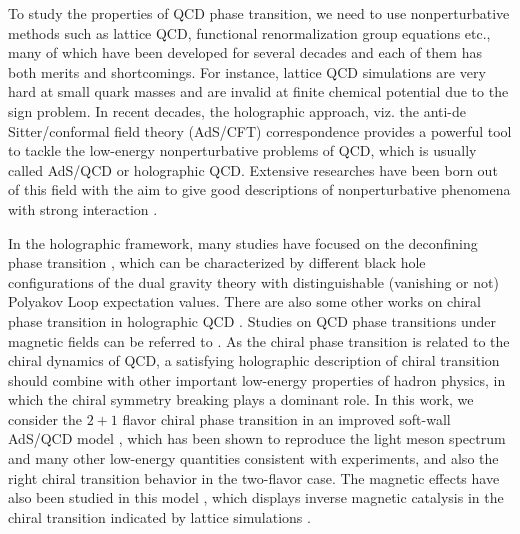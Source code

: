 \documentclass[11pt,a4paper,psfrag]{article}
\begin{document}
To study the properties of QCD phase transition, we need to use nonperturbative methods such as lattice QCD, functional renormalization group equations etc., many of which have been developed for several decades and each of them has both merits and shortcomings. For instance, lattice QCD simulations are very hard at small quark masses and are invalid at finite chemical potential due to the sign problem. In recent decades, the holographic approach, viz. the anti-de Sitter/conformal field theory (AdS/CFT) correspondence \cite{Maldacena:1997re,Gubser:1998bc,Witten:1998qj} provides a powerful tool to tackle the low-energy nonperturbative problems of QCD, which is usually called AdS/QCD or holographic QCD. Extensive researches have been born out of this field with the aim to give good descriptions of nonperturbative phenomena with strong interaction \cite{Erlich:2005qh,Karch:2006pv,TB:05,DaRold2005,D3-D7,D4-D6,SS-1,SS-2,Csaki:2006ji,Cherman:2008eh,Dp-Dq,GKK1,GKK2,Sui:2009xe,Sui:2010ay,
Cui:2013xva,Fang:2016nfj,Li:2012ay,Li:2013oda,Shuryak:2004cy,Tannenbaum:2006ch,Policastro:2001yc,Cai:2009zv,Cai:2008ph,Sin:2004yx,Shuryak:2005ia,
Nastase:2005rp,Nakamura:2006ih,Sin:2006pv,Janik:2005zt,Herzog:2006gh,Gubser-drag,Li:2014hja,Li:2014dsa}.

In the holographic framework, many studies have focused on the deconfining phase transition \cite{Herzog:2006ra,BallonBayona:2007vp, Cai:2007zw,Kim:2007em,Andreev-T3,Colangelo:2010pe,Gubser:2008yx,Gubser:2008ny,Gubser:2008sz,Gursoy:2008bu,Gursoy,Gursoy-3,Gursoy:2008za, Finazzo:2014zga,Yaresko:2013tia,Li:2011hp,Cai:2012xh,He:2013qq,Yang:2014bqa,Cui:2014oba}, which can be characterized by different black hole configurations of the dual gravity theory with distinguishable (vanishing or not) Polyakov Loop expectation values. There are also some other works on chiral phase transition in holographic QCD \cite{Colangelo:2011sr,Chelabi:2015cwn,Chelabi:2015gpc,Li:2016smq,Bartz:2016ufc,Bartz:2017jku}. Studies on QCD phase transitions under magnetic fields can be referred to \cite{Evans:2016jzo,Fang:2016cnt,Mamo:2016xco,Dudal:2016joz,Dudal:2018rki, Ballon-Bayona:2017dvv}. As the chiral phase transition is related to the chiral dynamics of QCD, a satisfying holographic description of chiral transition should combine with other important low-energy properties of hadron physics, in which the chiral symmetry breaking plays a dominant role. In this work, we consider the $2+1$ flavor chiral phase transition in an improved soft-wall AdS/QCD model \cite{Fang:2016nfj}, which has been shown to reproduce the light meson spectrum and many other low-energy quantities consistent with experiments, and also the right chiral transition behavior in the two-flavor case. The magnetic effects have also been studied in this model \cite{Fang:2016cnt}, which displays inverse magnetic catalysis in the chiral transition indicated by lattice simulations \cite{Bali:2011qj,Bali:2012zg}.
\end{document}
